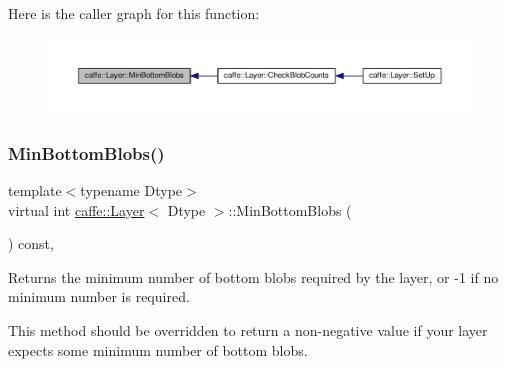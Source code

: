 Here is the caller graph for this function\+:
\nopagebreak
\begin{figure}[H]
\begin{center}
\leavevmode
\includegraphics[width=350pt]{classcaffe_1_1_layer_aca3cb2bafaefda5d4760aaebd0b72def_icgraph}
\end{center}
\end{figure}
\mbox{\label{classcaffe_1_1_layer_aca3cb2bafaefda5d4760aaebd0b72def}} 
\subsubsection{\texorpdfstring{Min\+Bottom\+Blobs()}{MinBottomBlobs()}\hspace{0.1cm}{\footnotesize\ttfamily [2/2]}}
{\footnotesize\ttfamily template$<$typename Dtype$>$ \\
virtual int \mbox{\hyperlink{classcaffe_1_1_layer}{caffe\+::\+Layer}}$<$ Dtype $>$\+::Min\+Bottom\+Blobs (\begin{DoxyParamCaption}{ }\end{DoxyParamCaption}) const\hspace{0.3cm}{\ttfamily [inline]}, {\ttfamily [virtual]}}



Returns the minimum number of bottom blobs required by the layer, or -\/1 if no minimum number is required. 

This method should be overridden to return a non-\/negative value if your layer expects some minimum number of bottom blobs. 

